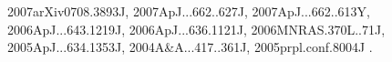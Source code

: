 \documentclass[12pt]{article}
\begin{document}
\begin{enumerate}
\begin{enumerate}
{2007arXiv0708.3893J,%
2007ApJ...662..627J,%
2007ApJ...662..613Y,%
2006ApJ...643.1219J,%
2006ApJ...636.1121J,%
2006MNRAS.370L..71J,%
2005ApJ...634.1353J,%
2004A&A...417..361J,%
2005prpl.conf.8004J%
}.


\end{enumerate}
\end{enumerate}
\end{document}

